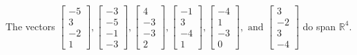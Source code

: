 \begin{exercise}
\begin{exerciseStatement}
  \end{exerciseStatement}
  \begin{exerciseAnswer}
   The vectors \(\left[\begin{array}{r}
-5 \\
3 \\
-2 \\
1
\end{array}\right] , \left[\begin{array}{r}
-3 \\
-5 \\
-1 \\
-3
\end{array}\right] , \left[\begin{array}{r}
4 \\
-3 \\
-3 \\
2
\end{array}\right] , \left[\begin{array}{r}
-1 \\
3 \\
-4 \\
1
\end{array}\right] , \left[\begin{array}{r}
-4 \\
1 \\
-3 \\
0
\end{array}\right] , \text{ and } \left[\begin{array}{r}
3 \\
-2 \\
3 \\
-4
\end{array}\right]\) 
  	 do  
	span \(\mathbb{R}^4\).
  


  \end{exerciseAnswer}
\end{exercise}